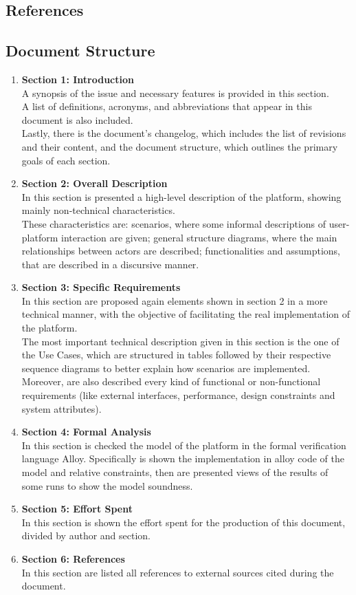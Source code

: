 \subsection{References}

\subsection{Document Structure}
\begin{enumerate}[label=$\bullet$]
    \item \textbf{Section 1: Introduction}\\
    A synopsis of the issue and necessary features is provided in this section.\\
    A list of definitions, acronyms, and abbreviations that appear in this document is also included.\\
    Lastly, there is the document's changelog, which includes the list of revisions and their content, and the document structure, which outlines the primary goals of each section.
    \item \textbf{Section 2: Overall Description}\\
    In this section is presented a high-level description of the platform, showing mainly non-technical characteristics.\\
    These characteristics are: 
    scenarios, where some informal descriptions of user-platform interaction are given; 
    general structure diagrams, where the main relationships between actors are described; 
    functionalities and assumptions, that are described in a discursive manner.
    \item \textbf{Section 3: Specific Requirements}\\
    In this section are proposed again elements shown in section 2 in a more technical manner, with the objective of facilitating the real implementation of the platform.\\
    The most important technical description given in this section is the one of the Use Cases, which are structured in tables followed by their respective sequence diagrams to better explain how scenarios are implemented.\\
    Moreover, are also described every kind of functional or non-functional requirements (like external interfaces, performance, design constraints and system attributes).
    \item \textbf{Section 4: Formal Analysis}\\
    In this section is checked the model of the platform in the formal verification language Alloy.
    Specifically is shown the implementation in alloy code of the model and relative constraints, then are presented views of the results of some runs to show the model soundness.
    \item \textbf{Section 5: Effort Spent}\\
    In this section is shown the effort spent for the production of this document, divided by author and section.
    \item \textbf{Section 6: References}\\
    In this section are listed all references to external sources cited during the document.


\end{enumerate}

\newpage